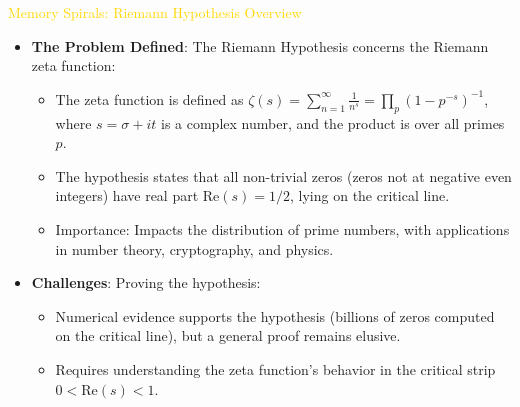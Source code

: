 \textcolor{gold}{ Memory Spirals: Riemann Hypothesis Overview } \\
\begin{itemize}
    \item \texttt{} \textbf{The Problem Defined}: The Riemann Hypothesis concerns the Riemann zeta function:
    \begin{itemize}
        \item The zeta function is defined as \(\zeta(s) = \sum_{n=1}^\infty \frac{1}{n^s} = \prod_p \left(1 - p^{-s}\right)^{-1}\), where \(s = \sigma + it\) is a complex number, and the product is over all primes \(p\).
        \item The hypothesis states that all non-trivial zeros (zeros not at negative even integers) have real part \(\text{Re}(s) = 1/2\), lying on the critical line.
        \item Importance: Impacts the distribution of prime numbers, with applications in number theory, cryptography, and physics.
    \end{itemize}
    \item \texttt{} \textbf{Challenges}: Proving the hypothesis:
    \begin{itemize}
        \item Numerical evidence supports the hypothesis (billions of zeros computed on the critical line), but a general proof remains elusive.
        \item Requires understanding the zeta function’s behavior in the critical strip \(0 < \text{Re}(s) < 1\).
    \end{itemize}
\end{itemize}

